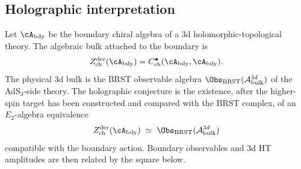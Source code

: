 \subsection{Holographic interpretation}

\begin{conjecture}\label{conj:holographic-koszul}
Let $\cA_{\mathrm{bdy}}$ be the boundary chiral algebra of a
$3$d holomorphic-topological theory.  The algebraic bulk attached to
the boundary is
\[
Z^{\mathrm{der}}_{\mathrm{ch}}(\cA_{\mathrm{bdy}})
=C^\bullet_{\mathrm{ch}}(\cA_{\mathrm{bdy}},\cA_{\mathrm{bdy}}).
\]
The physical $3$d bulk is the BRST observable algebra
$\Obs_{\mathrm{BRST}}(\mathcal A_{\mathrm{bulk}}^{3d})$ of the
AdS$_3$-side theory.  The holographic conjecture is the existence,
after the higher-spin target has been constructed and compared with
the BRST complex, of an $E_2$-algebra equivalence
\[
Z^{\mathrm{der}}_{\mathrm{ch}}(\cA_{\mathrm{bdy}})
\;\simeq\;
\Obs_{\mathrm{BRST}}(\mathcal A_{\mathrm{bulk}}^{3d})
\]
compatible with the boundary action.  Boundary observables and
$3$d HT amplitudes are then related by the square below.

\begin{center}
\end{center}


\end{conjecture}
